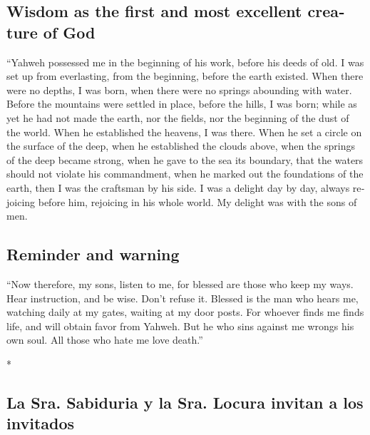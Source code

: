 \begin{paracol}{2}
\begin{otherlanguage}{english}
\hypertarget{wisdom-as-the-first-and-most-excellent-creature-of-god}{%
\subsection{Wisdom as the first and most excellent creature of
God}\label{wisdom-as-the-first-and-most-excellent-creature-of-god}}

 ``Yahweh possessed me in the beginning of his work,
before his deeds of old.  I was set up from everlasting,
from the beginning, before the earth existed.  When there
were no depths, I was born, when there were no springs abounding with
water.  Before the mountains were settled in place,
before the hills, I was born;  while as yet he had not
made the earth, nor the fields, nor the beginning of the dust of the
world.  When he established the heavens, I was there.
When he set a circle on the surface of the deep,  when he
established the clouds above, when the springs of the deep became
strong,  when he gave to the sea its boundary, that the
waters should not violate his commandment, when he marked out the
foundations of the earth,  then I was the craftsman by
his side. I was a delight day by day, always rejoicing before him,
 rejoicing in his whole world. My delight was with the
sons of men.

\hypertarget{reminder-and-warning}{%
\subsection{Reminder and warning}\label{reminder-and-warning}}

 ``Now therefore, my sons, listen to me, for blessed are
those who keep my ways.  Hear instruction, and be wise.
Don't refuse it.  Blessed is the man who hears me,
watching daily at my gates, waiting at my door posts. 
For whoever finds me finds life, and will obtain favor from Yahweh.
 But he who sins against me wrongs his own soul. All
those who hate me love death.''

\end{otherlanguage}

\switchcolumn[0]*

\hypertarget{la-sra.-sabiduria-y-la-sra.-locura-invitan-a-los-invitados}{%
\subsection{La Sra. Sabiduria y la Sra. Locura invitan a los
invitados}\label{la-sra.-sabiduria-y-la-sra.-locura-invitan-a-los-invitados}}


\end{paracol}
